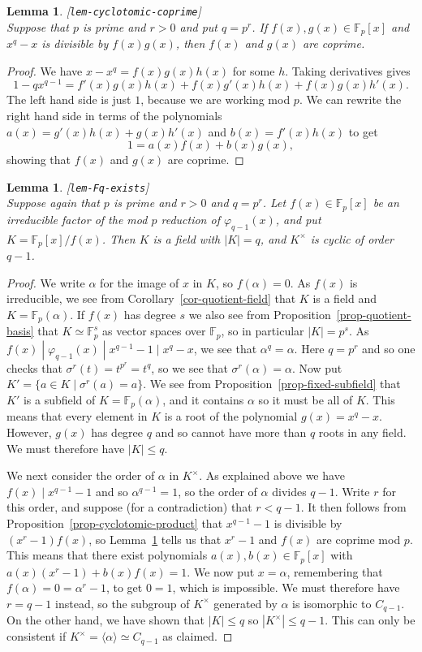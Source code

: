\documentclass{amsart}
\newcommand{\lbl}[1]{\label{#1}\textup{[\texttt{#1}]}\ \\}
\newcommand{\lbl}{\label}
\newcommand{\F}         {{\mathbb{F}}}
\newcommand{\al}        {\alpha}
\newcommand{\sg}        {\sigma}
\newcommand{\vph}       {\varphi}
\newcommand{\st}        {\;|\;}
\newcommand{\tm}        {\times}
\newcommand{\ip}[1]     {\langle #1\rangle}
\renewcommand{\:}{\colon}
\newtheorem{lemma}[theorem]{Lemma}
\theoremstyle{definition}
\begin{document}
\begin{lemma}\lbl{lem-cyclotomic-coprime}
 Suppose that $p$ is prime and $r>0$ and put $q=p^r$.  If
 $f(x),g(x)\in\F_p[x]$ and $x^q-x$ is divisible by $f(x)g(x)$, then
 $f(x)$ and $g(x)$ are coprime.
\end{lemma}
\begin{proof}
 We have $x-x^q=f(x)g(x)h(x)$ for some $h$.  Taking derivatives gives
 \[ 1-qx^{q-1} = f'(x)g(x)h(x) + f(x)g'(x)h(x) + f(x)g(x)h'(x). \]
  The left hand side is just $1$, because we are working mod $p$.  We
  can rewrite the right hand side in terms of the polynomials
  $a(x)=g'(x)h(x)+g(x)h'(x)$ and $b(x)=f'(x)h(x)$ to get 
 \[ 1= a(x)f(x)+b(x)g(x), \]
 showing that $f(x)$ and $g(x)$ are coprime.
\end{proof}

\begin{lemma}\lbl{lem-Fq-exists}
 Suppose again that $p$ is prime and $r>0$ and $q=p^r$.  Let
 $f(x)\in\F_p[x]$ be an irreducible factor of the mod $p$ reduction of
 $\vph_{q-1}(x)$, and put $K=\F_p[x]/f(x)$.  Then $K$ is a field with
 $|K|=q$, and $K^\tm$ is cyclic of order $q-1$.
\end{lemma}
\begin{proof}
 We write $\al$ for the image of $x$ in $K$, so $f(\al)=0$.  As $f(x)$
 is irreducible, we see from Corollary~\ref{cor-quotient-field} that
 $K$ is a field and $K=\F_p(\al)$.  If $f(x)$ has degree $s$ we also
 see from Proposition~\ref{prop-quotient-basis} that $K\simeq\F_p^s$
 as vector spaces over $\F_p$, so in particular $|K|=p^s$.  As
 $f(x)\;|\;\vph_{q-1}(x)\;|\;x^{q-1}-1\;|\;x^q-x$, we see that
 $\al^q=\al$.  Here $q=p^r$ and so one checks that
 $\sg^r(t)=t^{p^r}=t^q$, so we see that $\sg^r(\al)=\al$.  Now put
 $K'=\{a\in K\st\sg^r(a)=a\}$.  We see from
 Proposition~\ref{prop-fixed-subfield} that $K'$ is a subfield of
 $K=\F_p(\al)$, and it contains $\al$ so it must be all of $K$.  This
 means that every element in $K$ is a root of the polynomial
 $g(x)=x^q-x$.  However, $g(x)$ has degree $q$ and so cannot have more
 than $q$ roots in any field.  We must therefore have $|K|\leq q$.  

 We next consider the order of $\al$ in $K^\tm$.  As explained above
 we have $f(x)\;|\;x^{q-1}-1$ and so $\al^{q-1}=1$, so the order of
 $\al$ divides $q-1$.  Write $r$ for this order, and suppose (for a
 contradiction) that $r<q-1$.  It then follows from
 Proposition~\ref{prop-cyclotomic-product} that $x^{q-1}-1$ is
 divisible by $(x^r-1)f(x)$, so Lemma~\ref{lem-cyclotomic-coprime}
 tells us that $x^r-1$ and $f(x)$ are coprime mod $p$.  This means
 that there exist polynomials $a(x),b(x)\in\F_p[x]$ with
 $a(x)(x^r-1)+b(x)f(x)=1$.  We now put $x=\al$, remembering that
 $f(\al)=0=\al^r-1$, to get $0=1$, which is impossible.  We must
 therefore have $r=q-1$ instead, so the subgroup of $K^\tm$ generated
 by $\al$ is isomorphic to $C_{q-1}$.  On the other hand, we have
 shown that $|K|\leq q$ so $|K^\tm|\leq q-1$.  This can only be
 consistent if $K^\tm=\ip{\al}\simeq C_{q-1}$ as claimed.
\end{proof}
\end{document}
